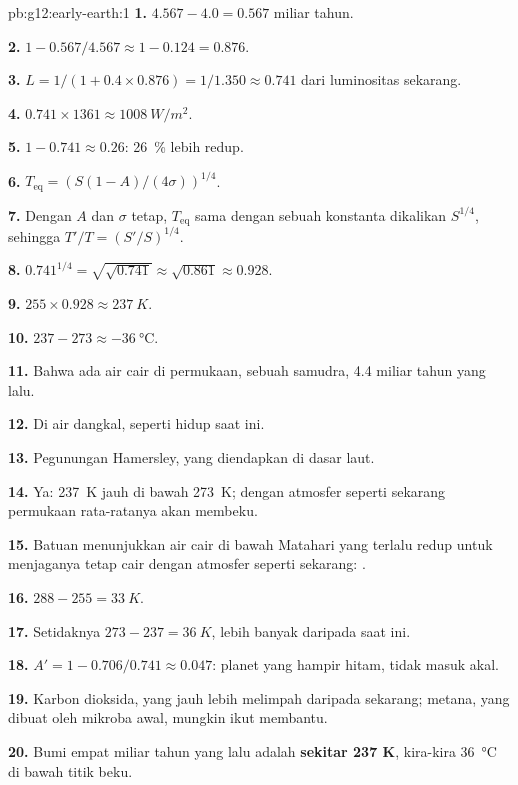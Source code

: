 \begin{solution}{pb:g12:early-earth:1}
\textbf{1.} $4.567 - 4.0 = 0.567$ miliar tahun.

\textbf{2.} $1 - 0.567/4.567 \approx 1 - 0.124 = 0.876$.

\textbf{3.} $L = 1/(1 + 0.4 \times 0.876) = 1/1.350 \approx 0.741$ dari
luminositas sekarang.

\textbf{4.} $0.741 \times 1361 \approx \qty{1008}{W/m^2}$.

\textbf{5.} $1 - 0.741 \approx 0.26$: \qty{26}{\percent} lebih redup.

\textbf{6.} $T_{\mathrm{eq}} = \left(S(1-A)/(4\sigma)\right)^{1/4}$.

\textbf{7.} Dengan $A$ dan $\sigma$ tetap, $T_{\mathrm{eq}}$ sama dengan sebuah
konstanta dikalikan $S^{1/4}$, sehingga $T'/T = (S'/S)^{1/4}$.

\textbf{8.} $0.741^{1/4} = \sqrt{\sqrt{0.741}} \approx \sqrt{0.861} \approx
0.928$.

\textbf{9.} $255 \times 0.928 \approx \qty{237}{K}$.

\textbf{10.} $237 - 273 \approx \qty{-36}{\celsius}$.

\textbf{11.} Bahwa ada air cair di permukaan, sebuah samudra, 4.4 miliar tahun
yang lalu.

\textbf{12.} Di air dangkal, seperti  hidup saat ini.

\textbf{13.}  Pegunungan Hamersley, yang diendapkan di
dasar laut.

\textbf{14.} Ya: \qty{237}{K} jauh di bawah \qty{273}{K}; dengan atmosfer
seperti sekarang permukaan rata-ratanya akan membeku.

\textbf{15.} Batuan menunjukkan air cair di bawah Matahari yang terlalu redup
untuk menjaganya tetap cair dengan atmosfer seperti sekarang: .

\textbf{16.} $288 - 255 = \qty{33}{K}$.

\textbf{17.} Setidaknya $273 - 237 = \qty{36}{K}$, lebih banyak daripada saat
ini.

\textbf{18.} $A' = 1 - 0.706/0.741 \approx 0.047$: planet yang hampir hitam,
tidak masuk akal.

\textbf{19.} Karbon dioksida, yang jauh lebih melimpah daripada sekarang;
metana, yang dibuat oleh mikroba awal, mungkin ikut membantu.

\textbf{20.}  Bumi empat miliar tahun yang lalu adalah
\textbf{sekitar 237 K}, kira-kira \qty{36}{\celsius} di bawah titik beku.
\end{solution}
